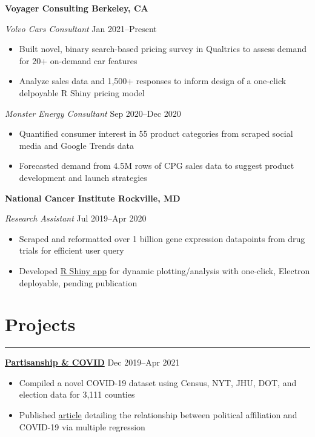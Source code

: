 \documentclass[11pt]{article}
\newcommand{\resumesection}[1]{\vspace{-0.6cm}\section*{\color{highlight}#1}\vspace{-0.3cm}\hrule\vspace{0.2cm}}
\begin{document}
\textbf{Voyager Consulting \hfill Berkeley, CA}\par

\textit{Volvo Cars Consultant} \hfill Jan 2021--Present
\begin{itemize}
	\item Built novel, binary search-based pricing survey in Qualtrics to assess demand for 20+ on-demand car features
	\item Analyze sales data and 1,500+ responses to inform design of a one-click delpoyable R Shiny pricing model
\end{itemize}\par

\textit{Monster Energy Consultant} \hfill Sep 2020--Dec 2020
\begin{itemize}
	\item Quantified consumer interest in 55 product categories from scraped social media and Google Trends data
	\item Forecasted demand from 4.5M rows of CPG sales data to suggest product development and launch strategies
\end{itemize}\par

\textbf{National Cancer Institute \hfill Rockville, MD}\par

\textit{Research Assistant} \hfill Jul 2019--Apr 2020 \par
\begin{itemize}
	\item Scraped and reformatted over 1 billion gene expression datapoints from drug trials for efficient user query
	\item Developed \href{https://github.com/petezh/TP-Workbench}{R Shiny app} for dynamic plotting/analysis with one-click, Electron deployable, pending publication
\end{itemize}\vspace{0.1cm}

\resumesection{Projects}

\textbf{\href{https://github.com/petezh/COVID-Analysis}{Partisanship \& COVID}} \hfill Dec 2019--Apr 2021 \par
\begin{itemize}
	\item Compiled a novel COVID-19 dataset using Census, NYT, JHU, DOT, and election data for 3,111 counties
	\item Published \href{https://econreview.berkeley.edu/partisanship-and-covid-19-response/}{article} detailing the relationship between political affiliation and COVID-19 via multiple regression
\end{itemize}\vspace{0.1cm} \par
\end{document}
